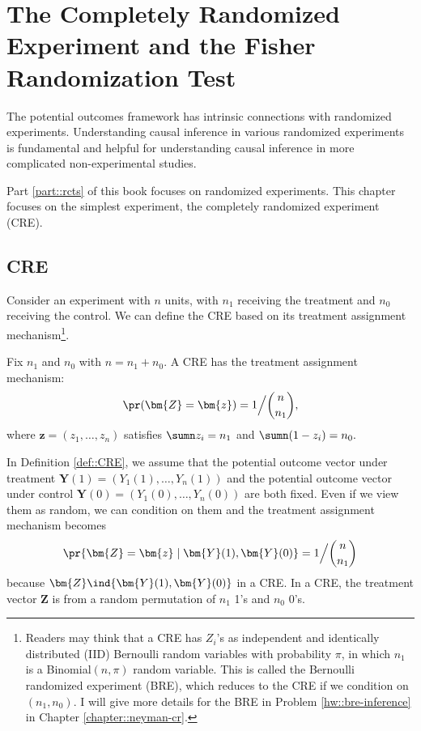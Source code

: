 
\chapter{The Completely Randomized Experiment and the Fisher Randomization Test}\label{ch::frt-cre}


The potential outcomes framework has intrinsic connections with randomized experiments. Understanding causal inference in various randomized experiments is fundamental and helpful for understanding causal inference in more complicated non-experimental studies.  


Part \ref{part::rcts} of this book focuses on randomized experiments. This chapter focuses on the simplest experiment, the completely randomized experiment (CRE). 

\section{CRE}

Consider an experiment with $n$ units, with $n_1$ receiving the treatment and $n_0$ receiving the control. We can define the CRE based on its treatment assignment mechanism\footnote{Readers may think that a CRE has $Z_i$'s as independent and identically distributed (IID) Bernoulli random variables with probability $\pi$, in which $n_1$ is a Binomial$(n,\pi)$ random variable. This is called the Bernoulli randomized experiment (BRE), which reduces to the CRE if we condition on $(n_1, n_0)$.
I will give more details for the BRE in Problem \ref{hw::bre-inference} in Chapter \ref{chapter::neyman-cr}. 
}.

\begin{definition}
[CRE]\label{def::CRE}
Fix $n_1$ and $n_0$ with $n = n_1 + n_0$.
A CRE has the treatment assignment mechanism:
$$
\pr(  \bm{Z} = \bm{z} ) = 1 \Big / \binom{n}{n_1},
$$
where $\bm{z} = (z_1,\ldots, z_n)$ satisfies $\sumn z_i  = n_1$ and $\sumn (1-z_i)  = n_0 . $
\end{definition}


In Definition \ref{def::CRE}, we assume that the potential outcome vector under treatment $\bm{Y}(1) = (Y_1(1), \ldots, Y_n(1) )$ and the potential outcome vector under control $\bm{Y}(0) = (Y_1(0), \ldots, Y_n(0) )$ are both fixed. Even if we view them as random, we can condition on them and the treatment assignment mechanism becomes 
$$
\pr\{    \bm{Z} = \bm{z} \mid \bm{Y}(1), \bm{Y}(0)  \} = 1 \Big / \binom{n}{n_1} 
$$
because $ \bm{Z} \ind \{\bm{Y}(1), \bm{Y}(0)\}$ in a CRE. In a CRE, the treatment vector $\bm{Z}$ is from a random permutation of $n_1$ 1's and $n_0$ 0's.

